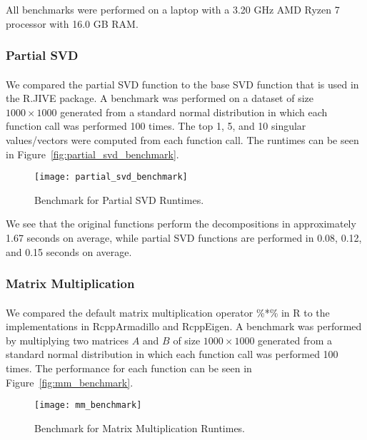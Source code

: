 \documentclass[
12pt, %
letterpaper, %
oneside, %
headinclude,footinclude, %
BCOR5mm, %
]{scrartcl}
\begin{document}
All benchmarks were performed on a laptop with a 3.20 GHz AMD Ryzen 7 processor with 16.0 GB RAM.

\subsubsection*{Partial SVD}

\paragraph*{}
We compared the partial SVD function to the base SVD function that is used in the R.JIVE package. A benchmark was performed on a dataset of size $1000 \times 1000$ generated from a standard normal distribution in which each function call was performed 100 times. The top 1, 5, and 10 singular values/vectors were computed from each function call. The runtimes can be seen in Figure~\vref{fig:partial_svd_benchmark}.

\begin{figure}[H]
    \centering 
    \texttt{[image: partial\_svd\_benchmark]} 
    \caption[Benchmark for Partial SVD Runtimes]{Benchmark for Partial SVD Runtimes.}
    \label{fig:partial_svd_benchmark} 
\end{figure}

We see that the original functions perform the decompositions in approximately 1.67 seconds on average, while partial SVD functions are performed in 0.08, 0.12, and 0.15 seconds on average. 

\subsubsection*{Matrix Multiplication}

\paragraph*{}
We compared the default matrix multiplication operator \%*\% in R to the implementations in RcppArmadillo and RcppEigen. A benchmark was performed by multiplying two matrices $A$ and $B$ of size $1000 \times 1000$ generated from a standard normal distribution in which each function call was performed 100 times. The performance for each function can be seen in Figure~\vref{fig:mm_benchmark}.

\begin{figure}[H]
    \centering 
    \texttt{[image: mm\_benchmark]} 
    \caption[Benchmark for Matrix Multiplication Runtimes]{Benchmark for Matrix Multiplication Runtimes.}
    \label{fig:mm_benchmark} 
\end{figure}
\end{document}
